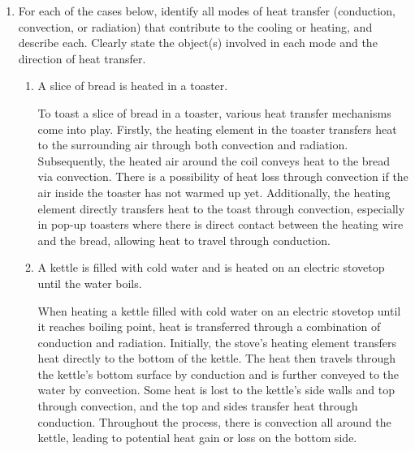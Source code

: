 \documentclass{zc-ust-hw}
\begin{document}
\maketitle

\begin{enumerate}
  \item For each of the cases below, identify all modes of heat transfer
    (conduction, convection, or radiation) that contribute to the cooling or
    heating, and describe each. Clearly state the object(s) involved in each
    mode and the direction of heat transfer. 
    \begin{enumerate}
      \item A slice of bread is heated in a toaster. 
        \begin{sol}
          To toast a slice of bread in a toaster, various heat transfer
          mechanisms come into play. Firstly, the heating element in the
          toaster transfers heat to the surrounding air through both convection
          and radiation. Subsequently, the heated air around the coil conveys
          heat to the bread via convection. There is a possibility of heat loss
          through convection if the air inside the toaster has not warmed up
          yet. Additionally, the heating element directly transfers heat to the
          toast through convection, especially in pop-up toasters where there
          is direct contact between the heating wire and the bread, allowing
          heat to travel through conduction.
        \end{sol}
      \item A kettle is filled with cold water and is heated on an electric stovetop until the water boils. 
        \begin{sol}
          When heating a kettle filled with cold water on an electric stovetop
          until it reaches boiling point, heat is transferred through a
          combination of conduction and radiation. Initially, the stove's
          heating element transfers heat directly to the bottom of the kettle.
          The heat then travels through the kettle's bottom surface by
          conduction and is further conveyed to the water by convection. Some
          heat is lost to the kettle's side walls and top through convection,
          and the top and sides transfer heat through conduction. Throughout
          the process, there is convection all around the kettle, leading to
          potential heat gain or loss on the bottom side.
        \end{sol}

\end{enumerate}
\end{enumerate}
\end{document}
